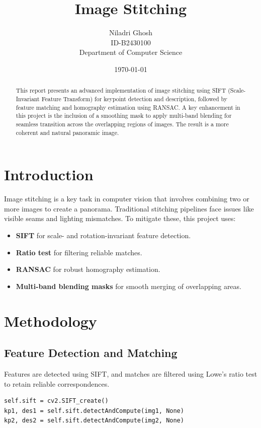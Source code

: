 \documentclass[12pt]{article}
\title{\textbf{Image Stitching}}
\author{Niladri Ghosh \\
ID-B2430100 \\
Department of Computer Science}
\date{\today}
\begin{document}
\maketitle

\begin{abstract}
This report presents an advanced implementation of image stitching using SIFT (Scale-Invariant Feature Transform) for keypoint detection and description, followed by feature matching and homography estimation using RANSAC. A key enhancement in this project is the inclusion of a smoothing mask to apply multi-band blending for seamless transition across the overlapping regions of images. The result is a more coherent and natural panoramic image.
\end{abstract}

\section{Introduction}
Image stitching is a key task in computer vision that involves combining two or more images to create a panorama. Traditional stitching pipelines face issues like visible seams and lighting mismatches. To mitigate these, this project uses:
\begin{itemize}
    \item \textbf{SIFT} for scale- and rotation-invariant feature detection.
    \item \textbf{Ratio test} for filtering reliable matches.
    \item \textbf{RANSAC} for robust homography estimation.
    \item \textbf{Multi-band blending masks} for smooth merging of overlapping areas.
\end{itemize}

\section{Methodology}

\subsection{Feature Detection and Matching}
Features are detected using SIFT, and matches are filtered using Lowe’s ratio test to retain reliable correspondences.

\begin{verbatim}
self.sift = cv2.SIFT_create()
kp1, des1 = self.sift.detectAndCompute(img1, None)
kp2, des2 = self.sift.detectAndCompute(img2, None)
\end{verbatim}
\end{document}
